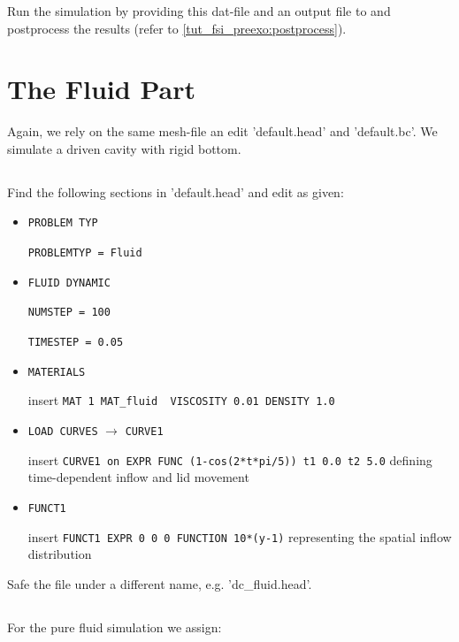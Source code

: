 Run the simulation by providing this dat-file and an output file to \baci{} and postprocess the results (refer to \ref{tut_fsi_preexo:postprocess}).

\section{The Fluid Part}
Again, we rely on the same mesh-file an edit 'default.head' and 'default.bc'. We simulate a driven cavity with rigid bottom.

\subsection{\head}
Find the following sections in 'default.head' and edit as given:

\begin{itemize}
 \item \verb|PROBLEM TYP|

 \verb|PROBLEMTYP = Fluid|
 \item \verb|FLUID DYNAMIC|

 \verb|NUMSTEP = 100|

 \verb|TIMESTEP = 0.05|

 \item \verb|MATERIALS|

  insert \verb|MAT 1 MAT_fluid  VISCOSITY 0.01 DENSITY 1.0|

  \item \verb|LOAD CURVES| $\to$ \verb|CURVE1|

  insert \verb|CURVE1 on EXPR FUNC (1-cos(2*t*pi/5)) t1 0.0 t2 5.0| defining time-dependent inflow and lid movement
 
   \item \verb|FUNCT1|

  insert \verb|FUNCT1 EXPR 0 0 0 FUNCTION 10*(y-1)| representing the spatial inflow distribution

\end{itemize}
Safe the file under a different name, e.g. 'dc\_fluid.head'.

\subsection{\bc}
For the pure fluid simulation we assign:

